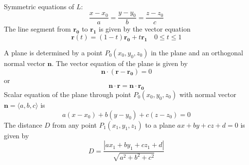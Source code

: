 \documentclass{article}
\begin{document}
        \begin{outline}
        \1 Symmetric equations of $L$: \[\dfrac{x-x_0}{a}=\dfrac{y-y_0}{b}=\dfrac{z-z_0}{c}\]
        \1 The line segment from \(\mathbf{r_0}\) to \(\mathbf{r_1}\) is given by the vector equation \[\mathbf r(t)=(1-t)\mathbf{r_0}+t\mathbf{r_1}\quad 0\leq t\leq 1\]
        \end{outline}\begin{multicols}{2}\begin{outline}
        \1 A plane is determined by a point \(P_0(x_0,y_0,z_0)\) in the plane and an orthogonal normal vector \(\mathbf n\). The vector equation of the plane is given by \[\mathbf{n\cdot}(\mathbf{r}-\mathbf{r_0})=0\] or \[\mathbf{n\cdot r}=\mathbf{n\cdot r_0}\]
        \1 Scalar equation of the plane through point \(P_0(x_0,y_0,z_0)\) with normal vector \(\mathbf n=\langle a,b,c\rangle\) is \[a(x-x_0)+b(y-y_0)+c(z-z_0)=0\]
        \1 The distance $D$ from any point \(P_1(x_1,y_1,z_1)\) to a plane \(ax+by+cz+d=0\) is given by \[D=\dfrac{|ax_1+by_1+cz_1+d|}{\sqrt{a^2+b^2+c^2}}\]

    \end{outline}\end{multicols}
\end{document}
